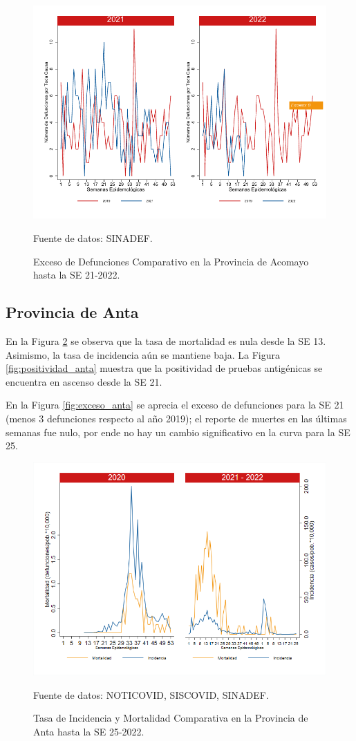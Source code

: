 \documentclass[12pt,a4paper,openany]{book}
\begin{document}
	\begin{figure}[h]
		\caption{Exceso de Defunciones Comparativo en la Provincia de Acomayo hasta la SE 21-2022.}\label{fig:exceso_acomayo}
		\begin{center}
			\includegraphics[width=0.7\linewidth]{../figuras/exceso_1.pdf}
		\end{center}
		{\footnotesize {Fuente de datos: SINADEF.}}
	\end{figure}
	
	\clearpage
	
	\subsection*{Provincia de Anta}
	\noindent En la Figura \ref{fig:inc_mort_anta} se observa que la tasa de mortalidad es nula desde la SE 13. Asimismo, la tasa de incidencia aún se mantiene baja. 
	\noindent La Figura
	\ref{fig:positividad_anta} muestra que la positividad de pruebas antigénicas se encuentra en ascenso desde la SE 21. 
	
	En la Figura \ref{fig:exceso_anta} se aprecia el exceso de defunciones para la SE 21 (menos 3 defunciones respecto al año 2019); el reporte de muertes en las últimas semanas fue nulo, por ende no hay un cambio significativo en la curva para la SE 25.
	
	\begin{figure}[h]
		\caption{Tasa de Incidencia y Mortalidad Comparativa en la Provincia de Anta hasta la SE 25-2022.}\label{fig:inc_mort_anta}
		\begin{center}
			\includegraphics[width=0.85\linewidth]{../figuras/incidencia_mortalidad_20_21_2.png}
		\end{center}
		{\footnotesize {Fuente de datos: NOTICOVID, SISCOVID, SINADEF.}}
	\end{figure}
	
\end{document}
